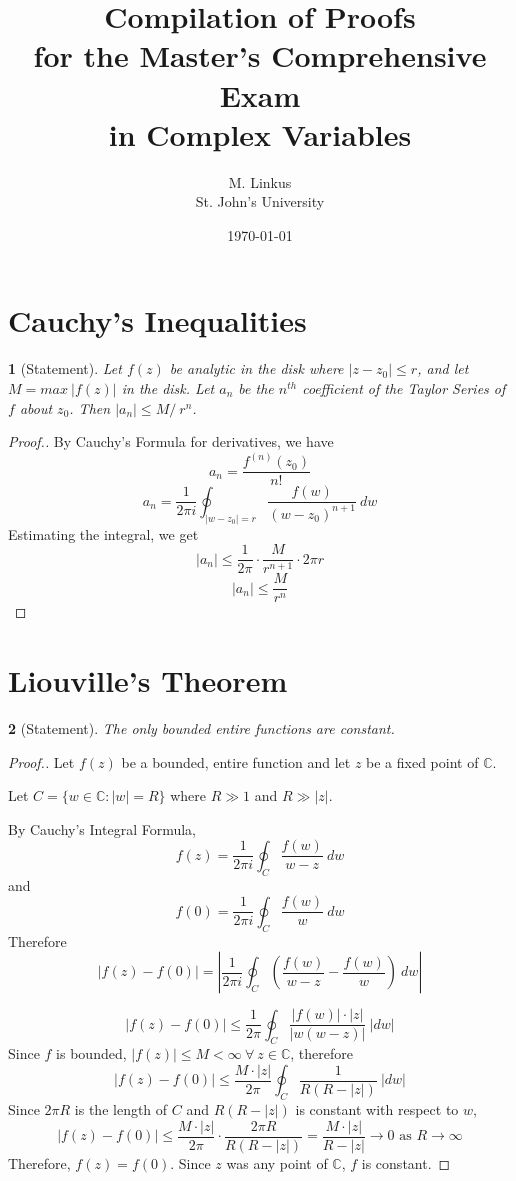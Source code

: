 \documentclass[12pt]{article}
\author{M. Linkus\\
St. John's University}
\title{Compilation of Proofs
\\for the Master's Comprehensive Exam
\\in Complex Variables}
\date{\today}
\theoremstyle{named}
\newtheorem*{theorem}{}
\begin{document}
\maketitle
\tableofcontents
\pagebreak

\section{Cauchy's Inequalities}
\begin{theorem}[Statement]
	Let $f(z)$ be analytic in the disk where $|z - z_{0} | \leq r$, and let $M = max ~|f(z)|$ in
	the disk.  Let $a_{n}$ be the $n^{th}$ coefficient of the Taylor Series of $f$ about $z_{0}$.
	Then  $|a_{n}| \leq M / ~r^{n}$.
\end{theorem}
\begin{proof}[Proof.]
By Cauchy's Formula for derivatives, we have
$$ a_n = \frac{f^{(n)}(z_0)}{n!} $$
$$ a_n = \frac{1}{2\pi i} \oint_{|w-z_0| = r} \frac{f(w)}{(w-z_0)^{n+1}} ~dw $$
Estimating the integral, we get
$$ |a_n| \leq \frac{1}{2\pi} \cdot \frac{M}{r^{n+1}} \cdot 2\pi r $$
$$ |a_n| \leq \frac{M}{r^n} $$
\end{proof}

%

\section{Liouville's Theorem}
\begin{theorem}[Statement]
	The only bounded entire functions are constant.
\end{theorem}
\begin{proof}[Proof.]
Let $f(z)$ be a bounded, entire function and let $z$ be a fixed point of $\mathbb{C}$.

Let $C = \{w \in \mathbb{C}: |w| = R \}$ where $R \gg 1$ and $R \gg |z|$.

By Cauchy's Integral Formula,
$$f(z) = \frac{1}{2\pi i} \oint_C \frac{f(w)}{w-z} ~dw $$
and
$$f(0) = \frac{1}{2\pi i} \oint_C \frac{f(w)}{w} ~dw $$
Therefore
$$|f(z) - f(0)| = \left|\frac{1}{2\pi i} \oint_C \left(\frac{f(w)}{w-z} - \frac{f(w)}{w}\right) ~dw \right|$$

$$|f(z) - f(0)| \leq \frac{1}{2\pi} \oint_C \frac{|f(w)| \cdot |z|}{|w (w-z)|} ~|dw| $$
Since $f$ is bounded, $|f(z)| \leq M < \infty ~\forall ~z \in \mathbb{C}$, therefore
$$|f(z) - f(0)| \leq \frac{M \cdot |z|}{2\pi} \oint_C \frac{1}{R (R-|z|)} ~|dw| $$
Since $2\pi R$ is the length of $C$ and $R (R-|z|)$ is constant with respect to $w$,
$$|f(z) - f(0)| \leq \frac{M \cdot |z|}{2\pi} \cdot \frac{2\pi R}{R (R-|z|)} = \frac{M \cdot |z|}{R-|z|} \to 0 \text{ as } R \to \infty$$
Therefore, $f(z) = f(0)$.  Since $z$ was any point of $\mathbb{C}$, $f$ is constant.
\end{proof}
\end{document}
